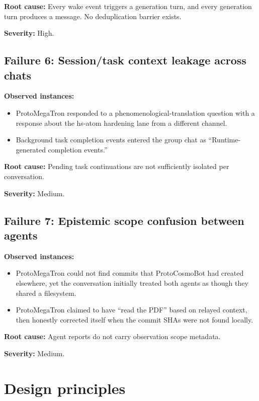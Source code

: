 \documentclass[11pt]{article}
\begin{document}
\textbf{Root cause:} Every wake event triggers a generation turn, and every
generation turn produces a message.  No deduplication barrier exists.

\textbf{Severity:} High.

\subsection{Failure 6: Session/task context leakage across chats}

\textbf{Observed instances:}
\begin{itemize}
\item ProtoMegaTron responded to a phenomenological-translation question with
a response about the hs-atom hardening lane from a different channel.
\item Background task completion events entered the group chat as
``Runtime-generated completion events.''
\end{itemize}

\textbf{Root cause:} Pending task continuations are not sufficiently isolated
per conversation.

\textbf{Severity:} Medium.

\subsection{Failure 7: Epistemic scope confusion between agents}

\textbf{Observed instances:}
\begin{itemize}
\item ProtoMegaTron could not find commits that ProtoCosmoBot had created
elsewhere, yet the conversation initially treated both agents as though they
shared a filesystem.
\item ProtoMegaTron claimed to have ``read the PDF'' based on relayed context,
then honestly corrected itself when the commit SHAs were not found locally.
\end{itemize}

\textbf{Root cause:} Agent reports do not carry observation scope metadata.

\textbf{Severity:} Medium.

\section{Design principles}
\end{document}

